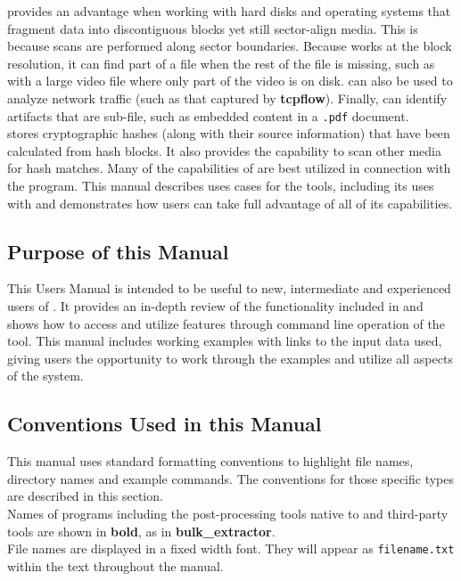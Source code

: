 \documentclass[11pt,fleqn]{article} %
\begin{document}
\hash provides an advantage when working with hard disks and operating systems that fragment data into discontiguous blocks yet still sector-align media. This is because scans are performed along sector boundaries. Because \hash works at the block resolution, it can find part of a file when the rest of the file is missing, such as with a large video file where only part of the video is on disk. \hash can also be used to analyze network traffic (such as that captured by \textbf{tcpflow}).  Finally, \hash can identify artifacts that are sub-file, such as embedded content in a \texttt{.pdf} document.\\

\hash stores cryptographic hashes (along with their source information) that have been calculated from hash blocks. It also provides the capability to scan other media for hash matches. Many of the capabilities of \hash are best utilized in connection with the \bulk program. This manual describes uses cases for the \hash tools, including its uses with \bulk and demonstrates how users can take full advantage of all of its capabilities.

\subsection{Purpose of this Manual}
This Users Manual is intended to be useful to new, intermediate and experienced users of \hash. It provides an in-depth review of the functionality included in \hash and shows how to access and utilize features through command line operation of the tool. This manual includes working examples with links to the input data used, giving users the opportunity to work through the examples and utilize all aspects of the system. 

\subsection{Conventions Used in this Manual}
This manual uses standard formatting conventions to highlight file names, directory names and example commands. The conventions for those specific types are described in this section. \\

Names of programs including the post-processing tools native to \hash and third-party tools are shown in \textbf{bold}, as in \textbf{bulk\_extractor}.\\

File names are displayed in a fixed width font. They will appear as \texttt{filename.txt} within the text throughout the manual.\\
\end{document}
